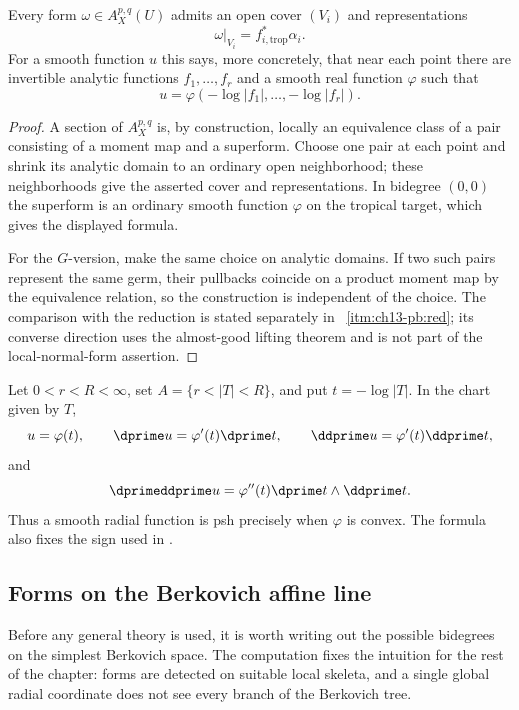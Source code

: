 \begin{proposition}\label{prop:cld-local-normal-form}
Every form $\omega\in A_X^{p,q}(U)$ admits an open cover $(V_i)$ and
representations
\[
                  \omega|_{V_i}=f_{i,\mathrm{trop}}^*\alpha_i.
\]
For a smooth function $u$ this says, more concretely, that near each point
there are invertible analytic functions $f_1,\ldots,f_r$ and a smooth real
function $\varphi$ such that
\[
 u=\varphi(-\log|f_1|,\ldots,-\log|f_r|).
\]
\end{proposition}
\begin{proof}
A section of $A_X^{p,q}$ is, by construction, locally an equivalence class
of a pair consisting of a moment map and a superform.  Choose one pair at
each point and shrink its analytic domain to an ordinary open neighborhood;
these neighborhoods give the asserted cover and representations.  In
bidegree $(0,0)$ the superform is an ordinary smooth function $\varphi$ on
the tropical target, which gives the displayed formula.

For the $G$-version, make the same choice on analytic domains.  If two such
pairs represent the same germ, their pullbacks coincide on a product moment
map by the equivalence relation, so the construction is independent of the
choice.  The comparison with the reduction is stated separately in
\,
\cref{itm:ch13-pb:red}; its converse direction uses the almost-good lifting
theorem and is not part of the local-normal-form assertion.
\end{proof}

\begin{example}[An annulus]
\label{ex:ch13-annulus-radial}
Let $0<r<R<\infty$, set $A=\{r<|T|<R\}$, and put $t=-\log|T|$.
In the chart given by $T$,
\[
 u=\varphi(t),\qquad
 \dprime u=\varphi'(t)\dprime t,\qquad
 \ddprime u=\varphi'(t)\ddprime t,
\]
and
\[
                    \dprimeddprime u
                     =\varphi''(t)\dprime t\wedge\ddprime t.
\]
Thus a smooth radial function is psh precisely when $\varphi$ is convex.
The formula also fixes the sign used in
.
\end{example}

\subsection{Forms on the Berkovich affine line}
\label{sec:ch13-line}

Before any general theory is used, it is worth writing out the possible
bidegrees on the simplest Berkovich space.  The computation fixes the
intuition for the rest of the chapter: forms are detected on suitable local
skeleta, and a single global radial coordinate does not see every branch of
the Berkovich tree.

